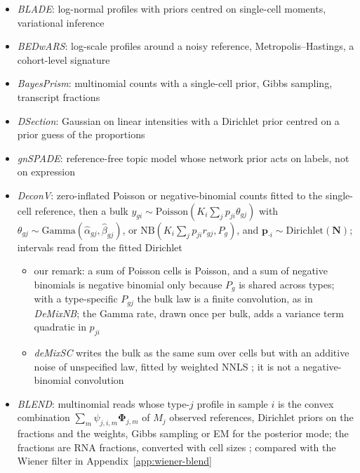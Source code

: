 \begin{itemize}
  \item \emph{BLADE}: log-normal profiles with priors centred on single-cell moments, variational inference
        \cite{andrade-barbosaBayesianLogNormalDeconvolution2021}
  \item \emph{BEDwARS}: log-scale profiles around a noisy reference, Metropolis--Hastings, a cohort-level signature
        \cite{ghaffariBEDwARSRobustBayesian2023}
  \item \emph{BayesPrism}: multinomial counts with a single-cell prior, Gibbs sampling, transcript fractions
        \cite{chuCellTypeGeneExpression2022}
  \item \emph{DSection}: Gaussian on linear intensities with a Dirichlet prior centred on a prior guess of the
        proportions \cite{erkkilaProbabilisticAnalysisGene2010}
  \item \emph{gnSPADE}: reference-free topic model whose network prior acts on labels, not on expression
        \cite{xieGnSPADEIncorporatingGene2026}
  \item \emph{DeconV}: zero-inflated Poisson or negative-binomial counts fitted to the single-cell reference, then a bulk
        \(y_{gi}\sim\mathrm{Poisson}(K_{i}\sum_{j}p_{ji}\theta_{gj})\) with \(\theta_{gj}\sim\mathrm{Gamma}(\hat\alpha_{gj},\hat\beta_{gj})\), or
        \(\mathrm{NB}(K_{i}\sum_{j}p_{ji}r_{gj},P_{g})\), and \(\boldsymbol{p}_{\cdot i}\sim\mathrm{Dirichlet}(\boldsymbol{N})\); intervals read from the fitted
        Dirichlet \cite[pp.~6--7]{gynterDeconvProbabilisticCellType2023}
  \begin{itemize}
    \item our remark: a sum of Poisson cells is Poisson, and a sum of negative binomials is negative binomial only because
          \(P_{g}\) is shared across types; with a type-specific \(P_{gj}\) the bulk law is a finite convolution, as in
          \emph{DeMixNB}; the Gamma rate, drawn once per bulk, adds a variance term quadratic in \(p_{ji}\)
    \item \emph{deMixSC} writes the bulk as the same sum over cells but with an additive noise of unspecified law, fitted by
          weighted NNLS \cite{guoDeMixSCDeconvolutionFramework2023}; it is not a negative-binomial convolution
  \end{itemize}
  \item \emph{BLEND}: multinomial reads whose type-\(j\) profile in sample \(i\) is the convex combination
        \(\sum_{m}\psi_{j,i,m}\boldsymbol{\Phi}_{j,m}\) of \(M_{j}\) observed references, Dirichlet priors on the fractions and the
        weights, Gibbs sampling or EM for the posterior mode; the fractions are RNA fractions, converted with cell sizes
        \cite[pp.~8--10]{huangBLENDProbabilisticCellular2024}; compared with the Wiener filter in
        Appendix~\ref{app:wiener-blend}
\end{itemize}

